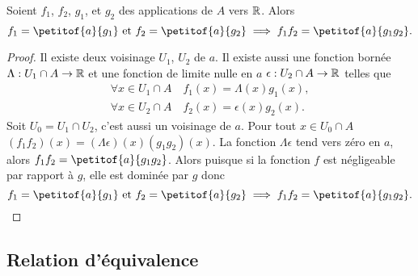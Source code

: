 \begin{prop}
  Soient $f_1$, $f_2$, $g_1$, et $g_2$ des applications de $A$ vers $\mathbb{R}$. Alors
  \begin{equation}
    f_1=\petitof{a}{g_1} \text{~et~} f_2=\petitof{a}{g_2} \implies f_1f_2 = \petitof{a}{g_1g_2}.
  \end{equation}
\end{prop}
\begin{proof}
  Il existe deux voisinage $U_1$, $U_2$ de $a$. Il existe aussi une fonction bornée $\Lambda : U_1\cap A \rightarrow \mathbb{R}$ et une fonction de limite nulle en $a$ $\epsilon : U_2\cap A \rightarrow \mathbb{R}$ telles que
  \begin{align}
    \forall x \in U_1 \cap A \quad f_1(x)=\Lambda(x)g_1(x),\\
    \forall x \in U_2 \cap A \quad f_2(x)=\epsilon(x)g_2(x).
  \end{align}
  Soit $U_0=U_1\cap U_2$, c'est aussi un voisinage de $a$. Pour tout $x \in U_0 \cap A$ $(f_1 f_2)(x)=(\Lambda \epsilon)(x) (g_1g_2)(x)$. La fonction $\Lambda \epsilon$ tend vers zéro en $a$, alors $f_1f_2 = \petitof{a}{g_1g_2}$. Alors puisque si la fonction $f$ est négligeable par rapport à $g$, elle est dominée par $g$ donc
  \begin{equation}
    f_1=\petitof{a}{g_1} \text{~et~} f_2=\petitof{a}{g_2} \implies f_1f_2 = \petitof{a}{g_1g_2}.
  \end{equation}
\end{proof}

\subsection{Relation d'équivalence}

